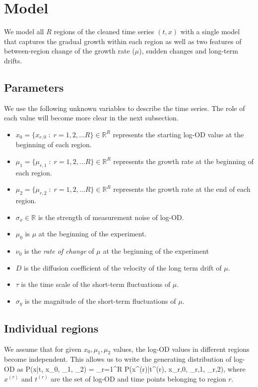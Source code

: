 \section{Model}

We model all $R$ regions of the cleaned time series $(t, x)$ with a single model that captures the gradual growth within each region as well as two features of between-region change of the growth rate ($\mu$), sudden changes and long-term drifts.

\subsection{Parameters}
We use the following unknown variables to describe the time series. The role of each value will become more clear in the next subsection.
\begin{itemize}
	\item $x_0 = \{x_{r,0}\;:\;r=1,2,\ldots R\} \in \mathds{R}^R$ represents the starting log-OD value at the beginning of each region.
	\item $\mu_1 = \{\mu_{r,1}\;:\;r=1,2,\ldots R\} \in \mathds{R}^R$  represents the growth rate at the beginning of each region.
	\item $\mu_2 = \{\mu_{r,2}\;:\;r=1,2,\ldots R\} \in \mathds{R}^R$  represents the growth rate at the end of each region.
	\item $\sigma_x \in \mathds{R}$ is the strength of measurement noise of log-OD.
	\item $\mu_0$ is $\mu$ at the beginning of the experiment.
	\item $\nu_0$ is the \emph{rate of change} of $\mu$ at the beginning of the experiment
	\item $D$ is the diffusion coefficient of the velocity of the long term drift of $\mu$.
	\item $\tau$ is the time scale of the short-term fluctuations of $\mu$.
	\item $\sigma_y$ is the magnitude of the short-term fluctuations of $\mu$.
\end{itemize}


\subsection{Individual regions}
We assume that for given $x_0, \mu_1, \mu_2$ values, the log-OD values in different regions become independent. This allows us to write the generating distribution of log-OD as 
\be
	P(x\;|\;t, x_0, \mu_1, \mu_2) = \prod_{r=1}^R P(x^{(r)}\;|\;t^{(r)}, x_{r,0}, \mu_{r,1}, \mu_{r,2})\quad ,
\ee
where $x^{(r)}$ and $t^{(r)}$ are the set of log-OD and time points belonging to region $r$.


